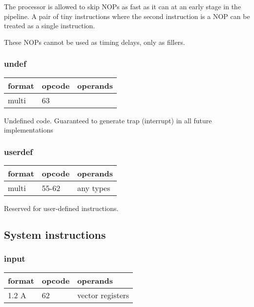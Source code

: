 \documentclass[forwardcom.tex]{subfiles}
\begin{document}
The processor is allowed to skip NOPs as fast as it can at an early stage in the pipeline. A pair of tiny instructions where the second instruction is a NOP can be treated as a single instruction.
\vspace{2mm}

These NOPs cannot be used as timing delays, only as fillers.

\subsubsection{undef}
\label{table:undefInstruction}
\begin{tabular}{|p{12mm}|p{12mm}|p{110mm}|}
\hline
\bfseries format & \bfseries opcode & \bfseries operands \\ \hline
multi & 63 & \\ \hline
\end{tabular}
\vspace{2mm}

Undefined code. Guaranteed to generate trap (interrupt) in all future implementations

\subsubsection{userdef}
\label{table:userdefInstruction}
\begin{tabular}{|p{12mm}|p{12mm}|p{110mm}|}
\hline
\bfseries format & \bfseries opcode & \bfseries operands \\ \hline
multi & 55-62 & any types \\ \hline
\end{tabular}
\vspace{2mm}

Reserved for user-defined instructions.
\vspace{2mm}

\subsection{System instructions}

\subsubsection{input}

\label{table:inputInstruction}
\begin{tabular}{|p{12mm}|p{12mm}|p{110mm}|}
\hline
\bfseries format & \bfseries opcode & \bfseries operands \\ \hline
1.2 A & 62 & vector registers \\ \hline
\end{tabular}
\vspace{2mm}
\end{document}
